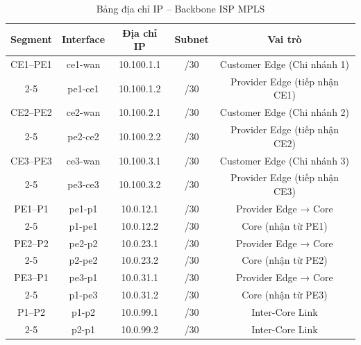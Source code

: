 \begin{table}[htbp]
    \centering
    \caption{Bảng địa chỉ IP – Backbone ISP MPLS}
    \vspace{0.2cm}
    \begin{tabularx}{\textwidth}{|c|c|c|c|c|}
        \hline
        \textbf{Segment} & \textbf{Interface} & \textbf{Địa chỉ IP} & \textbf{Subnet} & \textbf{Vai trò} \\ \hline
        CE1–PE1 & ce1-wan & 10.100.1.1 & /30 & Customer Edge (Chi nhánh 1) \\ \cline{2-5}
                 & pe1-ce1 & 10.100.1.2 & /30 & Provider Edge (tiếp nhận CE1) \\ \hline
        CE2–PE2 & ce2-wan & 10.100.2.1 & /30 & Customer Edge (Chi nhánh 2) \\ \cline{2-5}
                 & pe2-ce2 & 10.100.2.2 & /30 & Provider Edge (tiếp nhận CE2) \\ \hline
        CE3–PE3 & ce3-wan & 10.100.3.1 & /30 & Customer Edge (Chi nhánh 3) \\ \cline{2-5}
                 & pe3-ce3 & 10.100.3.2 & /30 & Provider Edge (tiếp nhận CE3) \\ \hline
        PE1–P1 & pe1-p1 & 10.0.12.1 & /30 & Provider Edge → Core \\ \cline{2-5}
                & p1-pe1 & 10.0.12.2 & /30 & Core (nhận từ PE1) \\ \hline
        PE2–P2 & pe2-p2 & 10.0.23.1 & /30 & Provider Edge → Core \\ \cline{2-5}
                & p2-pe2 & 10.0.23.2 & /30 & Core (nhận từ PE2) \\ \hline
        PE3–P1 & pe3-p1 & 10.0.31.1 & /30 & Provider Edge → Core \\ \cline{2-5}
                & p1-pe3 & 10.0.31.2 & /30 & Core (nhận từ PE3) \\ \hline
        P1–P2 & p1-p2 & 10.0.99.1 & /30 & Inter-Core Link \\ \cline{2-5}
               & p2-p1 & 10.0.99.2 & /30 & Inter-Core Link \\ \hline
    \end{tabularx}
\end{table}
